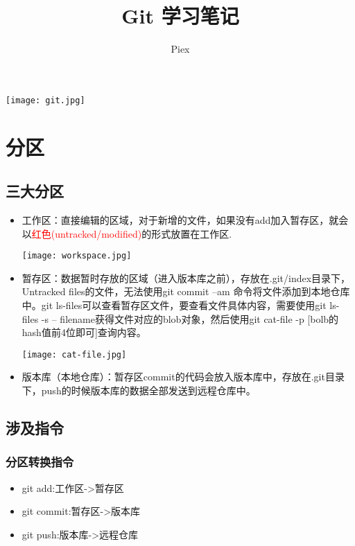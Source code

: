 \documentclass[cn,hazy,blue,14pt,通用]{elegantnote}
\title{Git 学习笔记}
\author{Piex}
\institute{UCAS}
\date{\zhtoday}
\begin{document}
\maketitle  %
\centerline{
    \texttt{[image: git.jpg]}
}
\newpage
\section{分区}
    \subsection{三大分区}
    \begin{itemize}
        \item 工作区：直接编辑的区域，对于新增的文件，如果没有add加入暂存区，就会以\textcolor{red}{红色(untracked/modified)}的形式放置在工作区.
        
        \texttt{[image: workspace.jpg]}
        \item 暂存区：数据暂时存放的区域（进入版本库之前），存放在.git/index目录下，Untracked files的文件，无法使用git commit –am 命令将文件添加到本地仓库中。git ls-files可以查看暂存区文件，要查看文件具体内容，需要使用git ls-files -s -- filename获得文件对应的blob对象，然后使用git cat-file -p [bolb的hash值前4位即可]查询内容。
        
        \texttt{[image: cat-file.jpg]}
        \item 版本库（本地仓库）：暂存区commit的代码会放入版本库中，存放在.git目录下，push的时候版本库的数据全部发送到远程仓库中。
    \end{itemize}
    \subsection{涉及指令}
        \subsubsection{分区转换指令}
        \begin{itemize}
            \item git add:工作区->暂存区
            \item git commit:暂存区->版本库
            \item git push:版本库->远程仓库
        \end{itemize}
\end{document}

